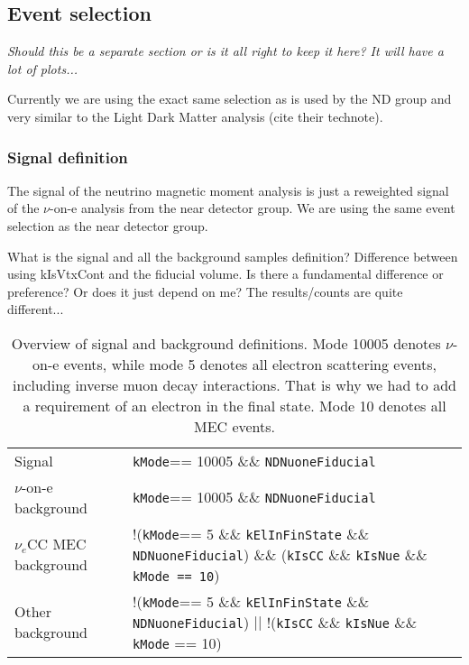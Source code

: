 \subsection{Event selection}
\textit{Should this be a separate section or is it all right to keep it here? It will have a lot of plots...}

Currently we are using the exact same selection as is used by the ND group \cite{NOVA-doc-56383} and very similar to the Light Dark Matter analysis (cite their technote).

\subsubsection*{Signal definition}
The signal of the neutrino magnetic moment analysis is just a reweighted signal of the $\nu$-on-e analysis from the near detector group. We are using the same event selection as the near detector group.

What is the signal and all the background samples definition? Difference between using kIsVtxCont and the fiducial volume. Is there a fundamental difference or preference? Or does it just depend on me? The results/counts are quite different...

\begin{table}[!ht]
\centering
\caption{Overview of signal and background definitions. Mode 10005 denotes $\nu$-on-e events, while mode 5 denotes all electron scattering events, including inverse muon decay interactions. That is why we had to add a requirement of an electron in the final state. Mode 10 denotes all MEC events.}
\def\arraystretch{1.4}
\begin{tabular}{p{}p{}}
Signal                   & \texttt{kMode}== 10005 \&\& \texttt{NDNuoneFiducial}\\
$\nu$-on-e background    & \texttt{kMode}== 10005 \&\& \texttt{NDNuoneFiducial}\\
$\nu_e$CC MEC background & !(\texttt{kMode}== 5 \&\& \texttt{kElInFinState} \&\& \texttt{NDNuoneFiducial}) \&\& (\texttt{kIsCC} \&\& \texttt{kIsNue} \&\& \texttt{kMode == 10})\\
Other background         & !(\texttt{kMode}== 5 \&\& \texttt{kElInFinState} \&\& \texttt{NDNuoneFiducial}) $||$ !(\texttt{kIsCC} \&\& \texttt{kIsNue} \&\& \texttt{kMode} == 10)
\end{tabular}
\label{tab:SignalDefinitions}
\end{table}

